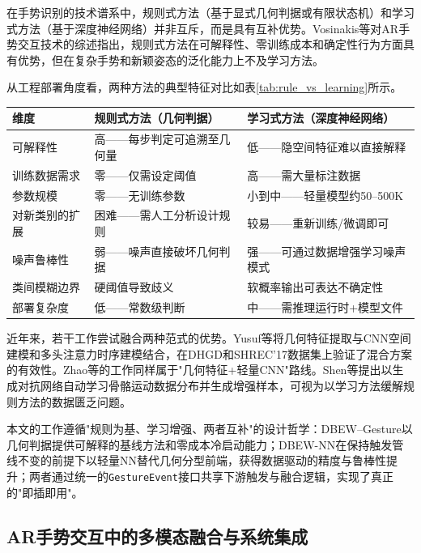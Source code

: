 在手势识别的技术谱系中，规则式方法（基于显式几何判据或有限状态机）和学习式方法（基于深度神经网络）并非互斥，而是具有互补优势。Vosinakis等\cite{vosinakis2024ar_gesture_interaction_review}对AR手势交互技术的综述指出，规则式方法在可解释性、零训练成本和确定性行为方面具有优势，但在复杂手势和新颖姿态的泛化能力上不及学习方法。

从工程部署角度看，两种方法的典型特征对比如表\ref{tab:rule_vs_learning}所示。

\begin{center}
    \small
    \begin{tabular}{p{3.0cm}p{4.5cm}p{4.5cm}}
    \hline
    维度 & 规则式方法（几何判据） & 学习式方法（深度神经网络） \\
    \hline
    可解释性 & 高——每步判定可追溯至几何量 & 低——隐空间特征难以直接解释 \\
    训练数据需求 & 零——仅需设定阈值 & 高——需大量标注数据 \\
    参数规模 & 零——无训练参数 & 小到中——轻量模型约50--500K \\
    对新类别的扩展 & 困难——需人工分析设计规则 & 较易——重新训练/微调即可 \\
    噪声鲁棒性 & 弱——噪声直接破坏几何判据 & 强——可通过数据增强学习噪声模式 \\
    类间模糊边界 & 硬阈值导致歧义 & 软概率输出可表达不确定性 \\
    部署复杂度 & 低——常数级判断 & 中——需推理运行时+模型文件 \\
    \hline
    \end{tabular}
\end{center}

近年来，若干工作尝试融合两种范式的优势。Yusuf等\cite{geometric_spatiotemporal_hgr2023}将几何特征提取与CNN空间建模和多头注意力时序建模结合，在DHGD和SHREC'17数据集上验证了混合方案的有效性。Zhao等\cite{zhao2022fast_skeleton_hgr}的工作同样属于"几何特征+轻量CNN"路线。Shen等\cite{shen2021imaginative_gan}提出以生成对抗网络自动学习骨骼运动数据分布并生成增强样本，可视为以学习方法缓解规则方法的数据匮乏问题。

本文的工作遵循"规则为基、学习增强、两者互补"的设计哲学：DBEW--Gesture以几何判据提供可解释的基线方法和零成本冷启动能力；DBEW-NN在保持触发管线不变的前提下以轻量NN替代几何分型前端，获得数据驱动的精度与鲁棒性提升；两者通过统一的\texttt{GestureEvent}接口共享下游触发与融合逻辑，实现了真正的"即插即用"。

\subsection{AR手势交互中的多模态融合与系统集成}

